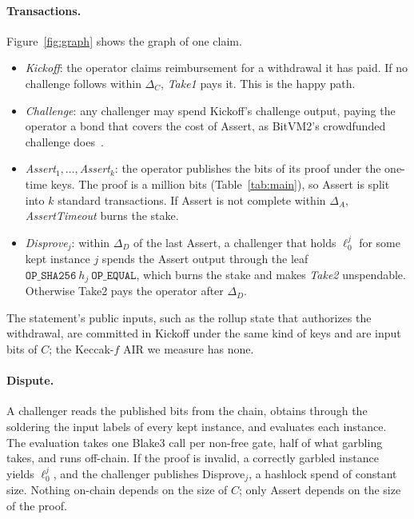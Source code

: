 \documentclass[11pt]{article}
\begin{document}
\paragraph{Transactions.} Figure~\ref{fig:graph} shows the graph of one claim.
\begin{itemize}
  \item \emph{Kickoff}: the operator claims reimbursement for a withdrawal it has
    paid. If no challenge follows within $\Delta_C$, \emph{Take1} pays it. This is
    the happy path.
  \item \emph{Challenge}: any challenger may spend Kickoff's challenge output,
    paying the operator a bond that covers the cost of Assert, as BitVM2's
    crowdfunded challenge does~\cite{laa25bitvm2}.
  \item \emph{Assert$_1,\dots,$Assert$_k$}: the operator publishes the bits of its
    proof under the one-time keys. The proof is a million bits
    (Table~\ref{tab:main}), so Assert is split into $k$ standard transactions. If
    Assert is not complete within $\Delta_A$, \emph{AssertTimeout} burns the stake.
  \item \emph{Disprove$_j$}: within $\Delta_D$ of the last Assert, a challenger that
    holds $\ell^j_0$ for some kept instance $j$ spends the Assert output through the
    leaf $\texttt{OP\_SHA256}\ h_j\ \texttt{OP\_EQUAL}$, which burns the stake and
    makes \emph{Take2} unspendable. Otherwise Take2 pays the operator after
    $\Delta_D$.
\end{itemize}
The statement's public inputs, such as the rollup state that authorizes the
withdrawal, are committed in Kickoff under the same kind of keys and are input
bits of $C$; the Keccak-$f$ AIR we measure has none.

\paragraph{Dispute.} A challenger reads the published bits from the chain,
obtains through the soldering the input labels of every kept instance, and
evaluates each instance. The evaluation takes one Blake3 call per non-free gate,
half of what garbling takes, and runs off-chain. If the proof is invalid, a correctly garbled
instance yields $\ell^j_0$, and the challenger publishes Disprove$_j$, a hashlock
spend of constant size. Nothing on-chain depends on the size of $C$; only Assert
depends on the size of the proof.
\end{document}
